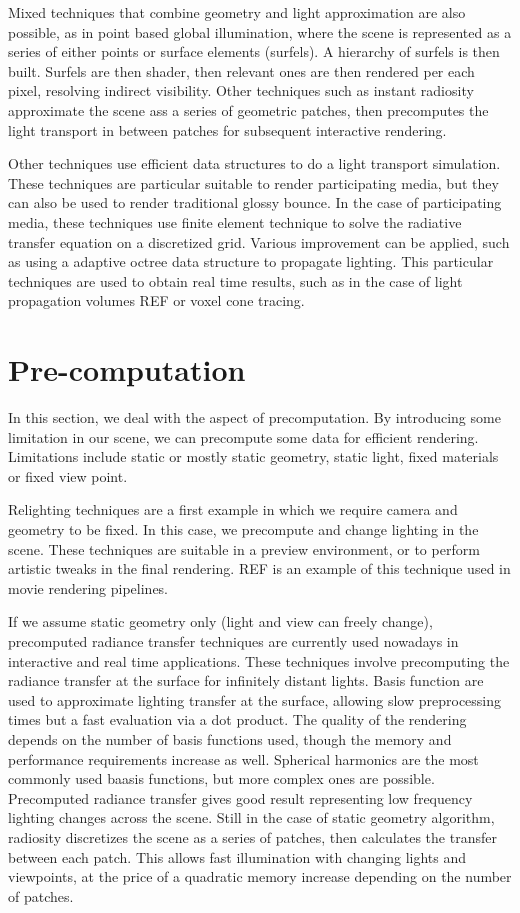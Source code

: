 Mixed techniques that combine geometry and light approximation are also possible, as in point based global illumination, where the scene is represented as a series of either points or surface elements (surfels). A hierarchy of surfels is then built. Surfels are then shader, then relevant ones are then rendered per each pixel, resolving indirect visibility. Other techniques such as instant radiosity approximate the scene ass a series of geometric patches, then precomputes the light transport in between patches for subsequent interactive rendering. 

Other techniques use efficient data structures to do a light transport simulation. These techniques are particular suitable to render participating media, but they can also be used to render traditional glossy bounce. In the case of participating media, these techniques use finite element technique to solve the radiative transfer equation on a discretized grid. Various improvement can be applied, such as using a adaptive octree data structure to propagate lighting. This particular techniques are used to obtain real time results, such as in the case of light propagation volumes REF or voxel cone tracing. 


\section{Pre-computation}
In this section, we deal with the aspect of precomputation. By introducing some limitation in our scene, we can precompute some data for efficient rendering. Limitations include static or mostly static geometry, static light, fixed materials or fixed view point. 

Relighting techniques are a first example in which we require camera and geometry to be fixed. In this case, we precompute and change lighting in the scene. These techniques are suitable in a preview environment, or to perform artistic tweaks in the final rendering. REF is an example of this technique used in movie rendering pipelines. 

If we assume static geometry only (light and view can freely change), precomputed radiance transfer techniques are currently used nowadays in interactive and real time applications. These techniques involve precomputing the radiance transfer at the surface for infinitely distant lights. Basis function are used to approximate lighting transfer at the surface, allowing slow preprocessing times but a fast evaluation via a dot product. The quality of the rendering depends on the number of basis functions used, though the memory and performance requirements increase as well. Spherical harmonics are the most commonly used baasis functions, but more complex ones are possible. Precomputed radiance transfer gives good result representing low frequency lighting changes across the scene. Still in the case of static geometry algorithm, radiosity discretizes the scene as a series of patches, then calculates the transfer between each patch. This allows fast illumination with changing lights and viewpoints, at the price of a quadratic memory increase depending on the number of patches. 

